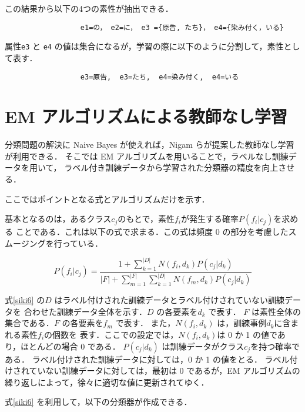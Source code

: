 この結果から以下の4つの素性が抽出できる．

\bigskip
\begin{verbatim}
                  e1=の， e2=に， e3 ={原告, たち}， e4={染み付く，いる}
\end{verbatim}
\bigskip

属性\verb|e3| と \verb|e4| の値は集合になるが，学習の際に以下のように分割して，素性として表す．

\begin{verbatim}
                  e3=原告,  e3=たち,  e4=染み付く,  e4=いる
\end{verbatim}



\section{EM アルゴリズムによる教師なし学習}


分類問題の解決に Naive Bayes が使えれば，Nigam らが提案した教師なし学習が利用できる．
そこでは EM アルゴリズムを用いることで，ラベルなし訓練データを用いて，
ラベル付き訓練データから学習された分類器の精度を向上させる．

ここではポイントとなる式とアルゴリズムだけを示す\cite{nigam00}．

基本となるのは，あるクラス\( c_j \)のもとで，素性\( f_i \)が発生する確率\( P(f_i|c_j) \)を求める
ことである．これは以下の式で求まる．この式は頻度 0 の部分を考慮したスムージングを行っている．

\begin{equation}
  \label{siki6}
P(f_i|c_j) = \frac{1 + \sum_{k = 1}^{|D|}N(f_i,d_k)P(c_j|d_k)}{|F| + \sum_{m = 1}^{|F|}\sum_{k = 1}^{|D|}N(f_m,d_k)P(c_j|d_k)}
\end{equation}

式\ref{siki6} の\( D \) はラベル付けされた訓練データとラベル付けされていない訓練データを
合わせた訓練データ全体を示す．\( D \) の各要素を\( d_k \) で表す．
\( F \) は素性全体の集合である．\( F \) の各要素を\( f_m \) で表す．
また，\( N(f_i,d_k) \) は，訓練事例\( d_k \)に含まれる素性\( f_i \)の個数を
表す．ここでの設定では，\( N(f_i,d_k) \)は 0 か 1 の値であり，ほとんどの場合 0 である．
\( P(c_j|d_k) \) は訓練データがクラス\( c_j \)を持つ確率である．
ラベル付けされた訓練データに対しては，0 か 1 の値をとる．
ラベル付けされていない訓練データに対しては，最初は 0 であるが，EM アルゴリズムの
繰り返しによって，徐々に適切な値に更新されてゆく．

式\ref{siki6} を利用して，以下の分類器が作成できる．

